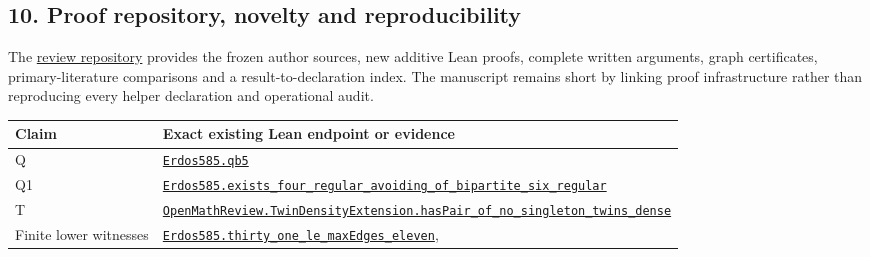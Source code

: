 \documentclass[
  11pt,
]{article}
\newcounter{none} %
\begin{document}
\subsection{10. Proof repository, novelty and
reproducibility}\label{proof-repository-novelty-and-reproducibility}

The
\href{https://github.com/alejandrozu/openmath-2026-judging/tree/70c5ec3107658182f22c207d4c50f53f9cb3e602/robert-review-2026-10-07}{review
repository} provides the frozen author sources, new additive Lean
proofs, complete written arguments, graph certificates,
primary-literature comparisons and a result-to-declaration index. The
manuscript remains short by linking proof infrastructure rather than
reproducing every helper declaration and operational audit.

{\def\LTcaptype{none} %
\begin{longtable}[]{@{}
  >{\raggedright\arraybackslash}p{}
  >{\raggedright\arraybackslash}p{}@{}}
\toprule\noalign{}
\begin{minipage}[b]{\linewidth}\raggedright
Claim
\end{minipage} & \begin{minipage}[b]{\linewidth}\raggedright
Exact existing Lean endpoint or evidence
\end{minipage} \\
\midrule\noalign{}
\endhead
\bottomrule\noalign{}
\endlastfoot
Q &
\href{https://github.com/alejandrozu/openmath-2026-judging/blob/70c5ec3107658182f22c207d4c50f53f9cb3e602/robert-review-2026-10-07/lean/Openmath/Proofs/QB5/Statement.lean\#L42}{\texttt{Erdos585.qb5}} \\
Q1 &
\href{https://github.com/alejandrozu/openmath-2026-judging/blob/70c5ec3107658182f22c207d4c50f53f9cb3e602/robert-review-2026-10-07/lean/Openmath/Proofs/QB4/Statement.lean\#L230}{\texttt{Erdos585.exists\_four\_regular\_avoiding\_of\_bipartite\_six\_regular}} \\
T &
\href{https://github.com/alejandrozu/openmath-2026-judging/blob/70c5ec3107658182f22c207d4c50f53f9cb3e602/robert-review-2026-10-07/lean/TwinDensityExtension.lean\#L132}{\texttt{OpenMathReview.TwinDensityExtension.hasPair\_of\_no\_singleton\_twins\_dense}} \\
Finite lower witnesses &
\href{https://github.com/alejandrozu/openmath-2026-judging/blob/70c5ec3107658182f22c207d4c50f53f9cb3e602/robert-review-2026-10-07/lean/Openmath/Proofs/Final.lean\#L112}{\texttt{Erdos585.thirty\_one\_le\_maxEdges\_eleven}},

\end{longtable}}
\end{document}
